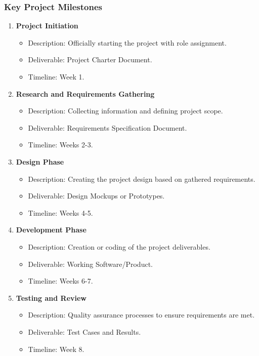\documentclass[aspectratio=169]{beamer}
\begin{document}
\begin{frame}[fragile]
    \frametitle{Key Project Milestones}
    \begin{enumerate}
        \item \textbf{Project Initiation}
        \begin{itemize}
            \item Description: Officially starting the project with role assignment.
            \item Deliverable: Project Charter Document.
            \item Timeline: Week 1.
        \end{itemize}
        
        \item \textbf{Research and Requirements Gathering}
        \begin{itemize}
            \item Description: Collecting information and defining project scope.
            \item Deliverable: Requirements Specification Document.
            \item Timeline: Weeks 2-3.
        \end{itemize}
        
        \item \textbf{Design Phase}
        \begin{itemize}
            \item Description: Creating the project design based on gathered requirements.
            \item Deliverable: Design Mockups or Prototypes.
            \item Timeline: Weeks 4-5.
        \end{itemize}
        
        \item \textbf{Development Phase}
        \begin{itemize}
            \item Description: Creation or coding of the project deliverables.
            \item Deliverable: Working Software/Product.
            \item Timeline: Weeks 6-7.
        \end{itemize}
        
        \item \textbf{Testing and Review}
        \begin{itemize}
            \item Description: Quality assurance processes to ensure requirements are met.
            \item Deliverable: Test Cases and Results.
            \item Timeline: Week 8.
        \end{itemize}
        

\end{enumerate}
\end{frame}
\end{document}
